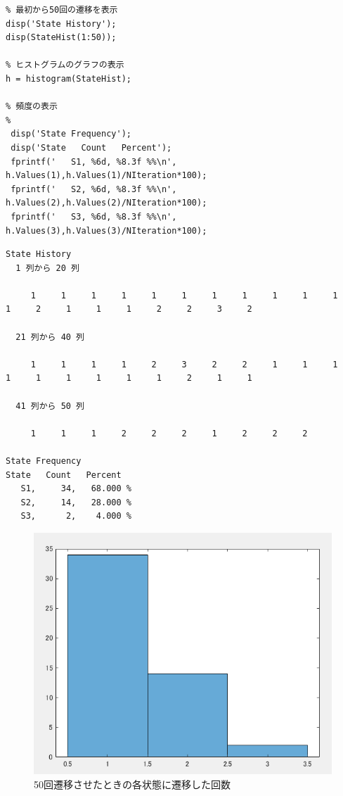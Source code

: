 \documentclass[documentclass]{jsarticle}
\begin{document}
\begin{lstlisting}[caption=状態変化を見るプログラム]
%% Evaluation
% 最初から50回の遷移を表示
disp('State History');
disp(StateHist(1:50));

% ヒストグラムのグラフの表示
h = histogram(StateHist);

% 頻度の表示
%
 disp('State Frequency');
 disp('State   Count   Percent');
 fprintf('   S1, %6d, %8.3f %%\n', h.Values(1),h.Values(1)/NIteration*100);
 fprintf('   S2, %6d, %8.3f %%\n', h.Values(2),h.Values(2)/NIteration*100);
 fprintf('   S3, %6d, %8.3f %%\n', h.Values(3),h.Values(3)/NIteration*100);

\end{lstlisting}

\begin{lstlisting}[caption=ソースコード3を実行したときの結果]
  State History
  1 列から 20 列

     1     1     1     1     1     1     1     1     1     1     1     1     2     1     1     1     2     2     3     2

  21 列から 40 列

     1     1     1     1     2     3     2     2     1     1     1     1     1     1     1     1     1     2     1     1

  41 列から 50 列

     1     1     1     2     2     2     1     2     2     2

State Frequency
State   Count   Percent
   S1,     34,   68.000 %
   S2,     14,   28.000 %
   S3,      2,    4.000 %
\end{lstlisting}

\begin{figure}[H]
  \begin{center}
    \includegraphics*[scale=0.6]{figure/3-1.png}
  \end{center}
  \caption{50回遷移させたときの各状態に遷移した回数}
  \label{fig:3-1}
\end{figure}
\end{document}
